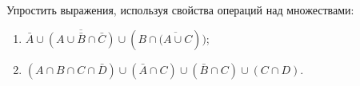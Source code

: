 \question
Упростить выражения, используя свойства операций над множествами:

\begin{enumerate}
	\renewcommand{\labelenumi}{\alph{enumi})}
	\item $\bar{A} \cup \overline{(A \cup \bar{B} \cap \bar{C})} \cup(B \cap \overline{(A \cup C}))$;
	\item $(A \cap B \cap C \cap \bar{D}) \cup(\bar{A} \cap C) \cup(\bar{B} \cap C) \cup(C \cap D)$.
\end{enumerate}
